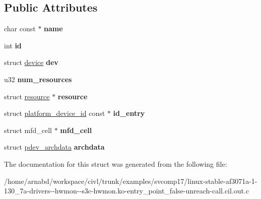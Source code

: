 \subsection*{Public Attributes}
\begin{DoxyCompactItemize}
\item 
\hypertarget{structplatform__device_a3d48a56329c36ab895164f3fd135cc02}{}char const $\ast$ {\bfseries name}\label{structplatform__device_a3d48a56329c36ab895164f3fd135cc02}

\item 
\hypertarget{structplatform__device_a5f09fc00a23ced0cdd2e3069f6ecd4cb}{}int {\bfseries id}\label{structplatform__device_a5f09fc00a23ced0cdd2e3069f6ecd4cb}

\item 
\hypertarget{structplatform__device_a5d72b25f3f644863273a6d5be17765b7}{}struct \hyperlink{structdevice}{device} {\bfseries dev}\label{structplatform__device_a5d72b25f3f644863273a6d5be17765b7}

\item 
\hypertarget{structplatform__device_a0dcca3917fdfdef9ecf1f9a3a97b7693}{}u32 {\bfseries num\+\_\+resources}\label{structplatform__device_a0dcca3917fdfdef9ecf1f9a3a97b7693}

\item 
\hypertarget{structplatform__device_a88749b4bdbf2acbb42b8a3aac243d8d2}{}struct \hyperlink{structresource}{resource} $\ast$ {\bfseries resource}\label{structplatform__device_a88749b4bdbf2acbb42b8a3aac243d8d2}

\item 
\hypertarget{structplatform__device_aaff09fba2430f15c42ff029b0b7c18df}{}struct \hyperlink{structplatform__device__id}{platform\+\_\+device\+\_\+id} const $\ast$ {\bfseries id\+\_\+entry}\label{structplatform__device_aaff09fba2430f15c42ff029b0b7c18df}

\item 
\hypertarget{structplatform__device_aacc3c9304469de2120b9e22d673912e2}{}struct mfd\+\_\+cell $\ast$ {\bfseries mfd\+\_\+cell}\label{structplatform__device_aacc3c9304469de2120b9e22d673912e2}

\item 
\hypertarget{structplatform__device_a87e87e1ee889d1cbbb25bd908ebd0b11}{}struct \hyperlink{structpdev__archdata}{pdev\+\_\+archdata} {\bfseries archdata}\label{structplatform__device_a87e87e1ee889d1cbbb25bd908ebd0b11}

\end{DoxyCompactItemize}


The documentation for this struct was generated from the following file\+:\begin{DoxyCompactItemize}
\item 
/home/arnabd/workspace/civl/trunk/examples/svcomp17/linux-\/stable-\/af3071a-\/1-\/130\+\_\+7a-\/drivers-\/-\/hwmon-\/-\/s3c-\/hwmon.\+ko-\/entry\+\_\+point\+\_\+false-\/unreach-\/call.\+cil.\+out.\+c\end{DoxyCompactItemize}
